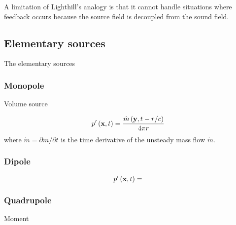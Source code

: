 A limitation of Lighthill's analogy is that it cannot handle situations where
feedback occurs because the source field is decoupled from the sound field.







\subsection{Elementary sources}

The elementary sources


\subsubsection*{Monopole}

Volume source
%

\begin{equation}
 p' \left(\mathbf{x},t\right) = \frac{\dot{m} \left(\mathbf{y}, t-r/c\right)}{ 4 \pi r}
\end{equation}
where $\dot{m} = \partial m / \partial t$ is the time derivative of the unsteady mass flow $\dot{m}$.

\subsubsection*{Dipole}

\begin{equation}
 p' \left(\mathbf{x}, t\right) =
\end{equation}


\subsubsection*{Quadrupole}

Moment

%
%
%


